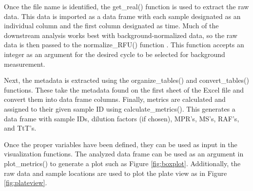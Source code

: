 \documentclass[preprint,12pt,a4paper]{elsarticle}
\begin{document}
            Once the file name is identified, the get\_real() function is used to extract the raw data. This data is imported as a data frame with each sample designated as an individual column and the first column designated as time. Much of the downstream analysis works best with background-normalized data, so the raw data is then passed to the normalize\_RFU() function \cite{Rowden2023}. This function accepts an integer as an argument for the desired cycle to be selected for background measurement. 
            
            Next, the metadata is extracted using the organize\_tables() and convert\_tables() functions. These take the metadata found on the first sheet of the Excel file and convert them into data frame columns. Finally, metrics are calculated and assigned to their given sample ID using calculate\_metrics(). This generates a data frame with sample IDs, dilution factors (if chosen), MPR's, MS's, RAF's, and TtT's.

            Once the proper variables have been defined, they can be used as input in the visualization functions. The analyzed data frame can be used as an argument in plot\_metrics() to generate a plot such as Figure \ref{fig:boxplot}. Additionally, the raw data and sample locations are used to plot the plate view as in Figure \ref{fig:plateview}.
\end{document}

